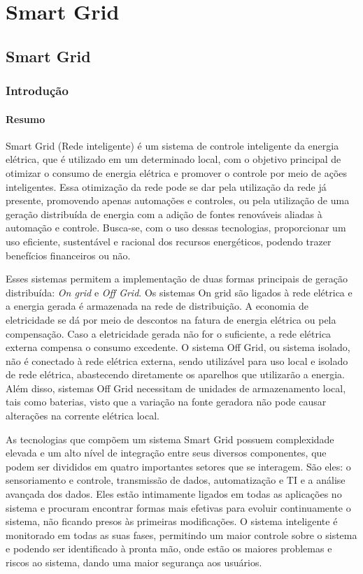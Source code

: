 \part{Smart Grid}

\chapter[Smart Grid]{Smart Grid}

\section{Introdução}

\subsection{Resumo}
Smart Grid (Rede inteligente) é um sistema de controle inteligente da energia elétrica, que é utilizado em um determinado local, com o objetivo principal de otimizar o consumo de energia elétrica e promover o controle por meio de ações inteligentes. Essa otimização da rede pode se dar pela utilização da rede já presente, promovendo apenas automações e controles, ou pela utilização de uma geração distribuída de energia com a adição de fontes renováveis aliadas à automação e controle. Busca-se, com o uso dessas tecnologias, proporcionar um uso eficiente, sustentável e racional dos recursos energéticos, podendo trazer benefícios financeiros ou não.

Esses sistemas permitem a implementação de duas formas principais de geração distribuída: \textit{On grid} e \textit{Off Grid}. Os sistemas On grid são ligados à rede elétrica e a energia gerada é armazenada na rede de distribuição. A economia de eletricidade se dá por meio de descontos na fatura de energia elétrica ou pela compensação. Caso a eletricidade gerada não for o suficiente, a rede elétrica externa compensa o consumo excedente. O sistema Off Grid, ou sistema isolado, não é conectado à rede elétrica externa, sendo utilizável para uso local e isolado de rede elétrica, abastecendo diretamente os aparelhos que utilizarão a energia. Além disso, sistemas Off Grid necessitam de unidades de armazenamento local, tais como baterias, visto que a variação na fonte geradora não pode causar alterações na corrente elétrica local. 

As tecnologias que compõem um sistema Smart Grid possuem complexidade elevada e um alto nível de integração entre seus diversos componentes, que podem ser divididos em quatro importantes setores que se interagem. São eles: o sensoriamento e controle, transmissão de dados, automatização e TI e a análise avançada dos dados. Eles estão intimamente ligados em todas as aplicações no sistema e procuram encontrar formas mais efetivas para evoluir continuamente o sistema, não ficando presos às primeiras modificações. O sistema inteligente é monitorado em todas as suas fases, permitindo um maior controle sobre o sistema e podendo ser identificado à pronta mão, onde estão os maiores problemas e riscos ao sistema, dando uma maior segurança aos usuários.


